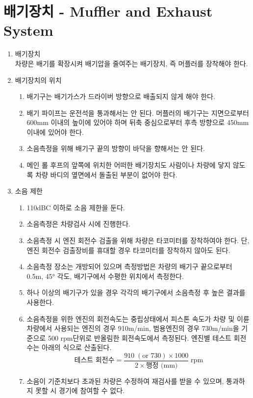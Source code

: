\documentclass[final,a4paper,10pt]{report}
\begin{document}
\section{배기장치 - Muffler and Exhaust System} \label{section:배기장치}
\begin{enumerate}
  \item 배기장치\\
    차량은 배기를 확장시켜 배기압을 줄여주는 배기장치, 즉 머플러를 장착해야 한다.
    
  \item 배기장치의 위치
    \begin{enumerate}
      \item 배기구는 배기가스가 드라이버 방향으로 배출되지 않게 해야 한다.
      \item 배기 파이프는 운전석을 통과해서는 안 된다. 머플러의 배기구는 지면으로부터 600mm 이내의 높이에 있어야 하며 뒤축 중심으로부터 후측 방향으로 450mm 이내에 있어야 한다.
      \item 소음측정을 위해 배기구 끝의 방향이 바닥을 향해서는 안 된다.
      \item 메인 롤 후프의 앞쪽에 위치한 어떠한 배기장치도 사람이나 차량에 닿지 않도록 차량 바디의 옆면에서 돌출된 부분이 없어야 한다.
    \end{enumerate}
    
  \item 소음 제한
    \begin{enumerate}
      \item 110dBC 이하로 소음 제한을 둔다.
      \item 소음측정은 차량검사 시에 진행한다.
      \item 소음측정 시 엔진 회전수 검출을 위해 차량은 타코미터를 장착하여야 한다. 단, 엔진 회전수 검출장비를 휴대할 경우 타코미터를 장착하지 않아도 된다.
      \item 소음측정 장소는 개방되어 있으며 측정방법은 차량의 배기구 끝으로부터 0.5m, 45° 각도, 배기구에서 수평한 위치에서 측정한다.
      \item 하나 이상의 배기구가 있을 경우 각각의 배기구에서 소음측정 후 높은 결과를 사용한다.
      \item 소음측정을 위한 엔진의 회전속도는 중립상태에서 피스톤 속도가 차량 및 이륜차량에서 사용되는 엔진의 경우 910m/min, 범용엔진의 경우 730m/min을 기준으로 500 rpm단위로 반올림한 회전속도에서 측정된다. 엔진별 테스트 회전수는 아래의 식으로 산출된다.
      \[
        \text{테스트 회전수}
        =
        \frac{910\;(\text{or }730)\times1000}{2\times\text{행정 (mm)}}
        \;\mathrm{rpm}
      \]
      \item 소음이 기준치보다 초과된 차량은 수정하여 재검사를 받을 수 있으며, 통과하지 못할 시 경기에 참여할 수 없다.
    \end{enumerate}
\end{enumerate}
\end{document}
